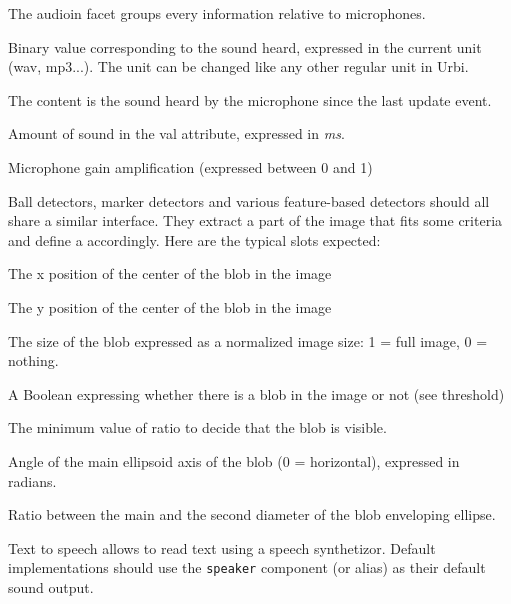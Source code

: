 
The audioin facet groups every information relative to microphones.

\begin{slots}
  {%
    Binary value corresponding to the sound heard, expressed in the
    current unit (wav, mp3...). The unit can be changed like any other
    regular unit in Urbi.

    The content is the sound heard by the microphone since the last
    update event.%
  }

  {%
    Amount of sound in the val attribute, expressed in \textit{ms}.%
  }

  {%
    Microphone gain amplification (expressed between 0 and 1)%
  }
\end{slots}



Ball detectors, marker detectors and various feature-based detectors
should all share a similar interface. They extract a part of the image
that fits some criteria and define a  accordingly. Here are
the typical slots expected:

\begin{slots}
  {%
    The x position of the center of the blob in the image%
  }

  {%
    The y position of the center of the blob in the image%
  }

  {%
    The size of the blob expressed as a normalized image size: 1 =
    full image, 0 = nothing.%
  }

  {%
    A Boolean expressing whether there is a blob in the image or not
    (see threshold)%
  }

  {%
    The minimum value of ratio to decide that the blob is visible.%
  }

  {%
    Angle of the main ellipsoid axis of the blob (0 = horizontal),
    expressed in radians.%
  }

  {%
    Ratio between the main and the second diameter of the blob
    enveloping ellipse.%
  }

\end{slots}

Text to speech allows to read text using a speech synthetizor. Default
implementations should use the \texttt{speaker} component (or alias) as
their default sound output.

